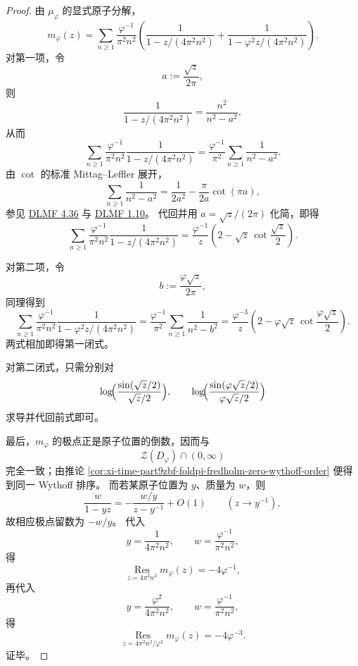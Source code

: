 \begin{proof}
由 \(\mu_\varphi\) 的显式原子分解，
\[
m_\varphi(z)
=
\sum_{n\ge 1}\frac{\varphi^{-1}}{\pi^2n^2}
\left(
\frac{1}{1-z/(4\pi^2n^2)}
+
\frac{1}{1-\varphi^2z/(4\pi^2n^2)}
\right).
\]
对第一项，令
\[
a:=\frac{\sqrt z}{2\pi},
\]
则
\[
\frac{1}{1-z/(4\pi^2n^2)}
=
\frac{n^2}{n^2-a^2},
\]
从而
\[
\sum_{n\ge 1}\frac{\varphi^{-1}}{\pi^2n^2}
\frac{1}{1-z/(4\pi^2n^2)}
=
\frac{\varphi^{-1}}{\pi^2}
\sum_{n\ge 1}\frac{1}{n^2-a^2}.
\]
由 \(\cot\) 的标准 Mittag--Leffler 展开，
\[
\sum_{n\ge 1}\frac{1}{n^2-a^2}
=
\frac{1}{2a^2}-\frac{\pi}{2a}\cot(\pi a),
\]
参见 \href{https://dlmf.nist.gov/4.36}{DLMF 4.36} 与 \href{https://dlmf.nist.gov/1.10}{DLMF 1.10}。
代回并用 \(a=\sqrt z/(2\pi)\) 化简，即得
\[
\sum_{n\ge 1}\frac{\varphi^{-1}}{\pi^2n^2}
\frac{1}{1-z/(4\pi^2n^2)}
=
\frac{\varphi^{-1}}{z}
\left(
2-\sqrt z\,\cot\frac{\sqrt z}{2}
\right).
\]

对第二项，令
\[
b:=\frac{\varphi\sqrt z}{2\pi},
\]
同理得到
\[
\sum_{n\ge 1}\frac{\varphi^{-1}}{\pi^2n^2}
\frac{1}{1-\varphi^2z/(4\pi^2n^2)}
=
\frac{\varphi^{-1}}{\pi^2}
\sum_{n\ge 1}\frac{1}{n^2-b^2}
=
\frac{\varphi^{-3}}{z}
\left(
2-\varphi\sqrt z\,\cot\frac{\varphi\sqrt z}{2}
\right).
\]
两式相加即得第一闭式。

对第二闭式，只需分别对
\[
\log\!\Bigl(\frac{\sin(\sqrt z/2)}{\sqrt z/2}\Bigr),
\qquad
\log\!\Bigl(\frac{\sin(\varphi\sqrt z/2)}{\varphi\sqrt z/2}\Bigr)
\]
求导并代回前式即可。

最后，\(m_\varphi\) 的极点正是原子位置的倒数，因而与
\[
\mathcal Z(D_\varphi)\cap (0,\infty)
\]
完全一致；由推论 \ref{cor:xi-time-part9zbf-foldpi-fredholm-zero-wythoff-order} 便得到同一 Wythoff 排序。
而若某原子位置为 \(y\)、质量为 \(w\)，则
\[
\frac{w}{1-yz}
=
-\frac{w/y}{z-y^{-1}}+O(1)
\qquad (z\to y^{-1}),
\]
故相应极点留数为 \(-w/y\)。
代入
\[
y=\frac{1}{4\pi^2n^2},
\qquad
w=\frac{\varphi^{-1}}{\pi^2n^2},
\]
得
\[
\operatorname*{Res}_{z=4\pi^2n^2}m_\varphi(z)
=
-4\varphi^{-1},
\]
再代入
\[
y=\frac{\varphi^2}{4\pi^2n^2},
\qquad
w=\frac{\varphi^{-1}}{\pi^2n^2},
\]
得
\[
\operatorname*{Res}_{z=4\pi^2n^2/\varphi^2}m_\varphi(z)
=
-4\varphi^{-3}.
\]
证毕。
\end{proof}

